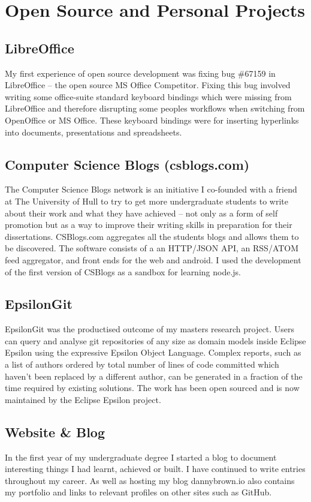 \documentclass[10pt,letterpaper]{article}
\begin{document}
	\section*{Open Source and Personal Projects}
	\subsection*{LibreOffice}
	My first experience of open source development was fixing bug \#67159 in LibreOffice -- the open source MS Office Competitor. Fixing this bug involved writing some office-suite standard keyboard bindings which were missing from LibreOffice and therefore disrupting some peoples workflows when switching from OpenOffice or MS Office. These keyboard bindings were for inserting hyperlinks into documents, presentations and spreadsheets.
	\subsection*{Computer Science Blogs \small{(csblogs.com)}}
	The Computer Science Blogs network is an initiative I co-founded with a friend at The University of Hull to try to get more undergraduate students to write about their work and what they have achieved -- not only as a form of self promotion but as a way to improve their writing skills in preparation for their dissertations. CSBlogs.com aggregates all the students blogs and allows them to be discovered. The software consists of a an HTTP/JSON API, an RSS/ATOM feed aggregator, and front ends for the web and android. I used the development of the first version of CSBlogs as a sandbox for learning node.js.
	
	\subsection*{EpsilonGit}
	EpsilonGit was the productised outcome of my masters research project. Users can query and analyse git repositories of any size as domain models inside Eclipse Epsilon using the expressive Epsilon Object Language. Complex reports, such as a list of authors ordered by total number of lines of code committed which haven't been replaced by a different author, can be generated in a fraction of the time required by existing solutions. The work has been open sourced and is now maintained by the Eclipse Epsilon project. 

	\subsection*{Website \& Blog}
	In the first year of my undergraduate degree I started a blog to document interesting things I had learnt, achieved or built. I have continued to write entries throughout my career. As well as hosting my blog dannybrown.io also contains my portfolio and links to relevant profiles on other sites such as GitHub.
	
\end{document}
